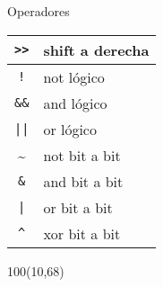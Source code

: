 \documentclass[aspectratio=169]{beamer}
\begin{document}
\begin{frame}[fragile,t]{Operadores}
\begin{textblock}{80}
\begin{tabular}{c|p{2.15cm}}
    \verb|>>| & \small \textcolor{verdeuca}{shift a derecha}   \\
    \hline
    \verb|!|  & \small \textcolor{verdeuca}{not lógico}     \\
    \verb|&&| & \small \textcolor{verdeuca}{and lógico}     \\
    \verb.||. & \small \textcolor{verdeuca}{or lógico}      \\
    \hline
    \textasciitilde  & \small \textcolor{verdeuca}{not bit a bit}  \\
    \verb|&|  & \small \textcolor{verdeuca}{and bit a bit}  \\
    \verb.|.  & \small \textcolor{verdeuca}{or bit a bit}   \\
    \verb|^|  & \small \textcolor{verdeuca}{xor bit a bit}  \\
    \end{tabular}
    \end{textblock}
    \begin{textblock}{100}(10,68)
    \end{textblock}
\end{frame}
\end{document}
